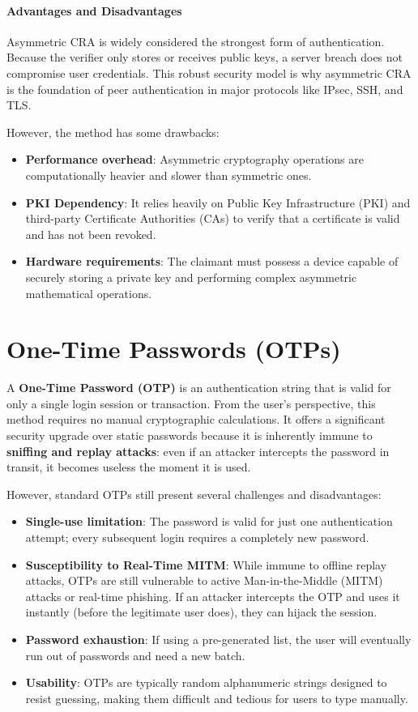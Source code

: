 
\paragraph{Advantages and Disadvantages}
Asymmetric CRA is widely considered the strongest form of authentication. Because the verifier only stores or receives public keys, a server breach does not compromise user credentials. This robust security model is why asymmetric CRA is the foundation of peer authentication in major protocols like IPsec, SSH, and TLS.

However, the method has some drawbacks:
\begin{itemize}
    \item \textbf{Performance overhead}: Asymmetric cryptography operations are computationally heavier and slower than symmetric ones.
    \item \textbf{PKI Dependency}: It relies heavily on Public Key Infrastructure (PKI) and third-party Certificate Authorities (CAs) to verify that a certificate is valid and has not been revoked.
    \item \textbf{Hardware requirements}: The claimant must possess a device capable of securely storing a private key and performing complex asymmetric mathematical operations.
\end{itemize}


\section{One-Time Passwords (OTPs)}
A \textbf{One-Time Password (OTP)} is an authentication string that is valid for only a single login session or transaction. From the user's perspective, this method requires no manual cryptographic calculations. It offers a significant security upgrade over static passwords because it is inherently immune to \textbf{sniffing and replay attacks}: even if an attacker intercepts the password in transit, it becomes useless the moment it is used.

However, standard OTPs still present several challenges and disadvantages:
\begin{itemize}
    \item \textbf{Single-use limitation}: The password is valid for just one authentication attempt; every subsequent login requires a completely new password.
    \item \textbf{Susceptibility to Real-Time MITM}: While immune to offline replay attacks, OTPs are still vulnerable to active Man-in-the-Middle (MITM) attacks or real-time phishing. If an attacker intercepts the OTP and uses it instantly (before the legitimate user does), they can hijack the session.
    \item \textbf{Password exhaustion}: If using a pre-generated list, the user will eventually run out of passwords and need a new batch.
    \item \textbf{Usability}: OTPs are typically random alphanumeric strings designed to resist guessing, making them difficult and tedious for users to type manually.
\end{itemize}


